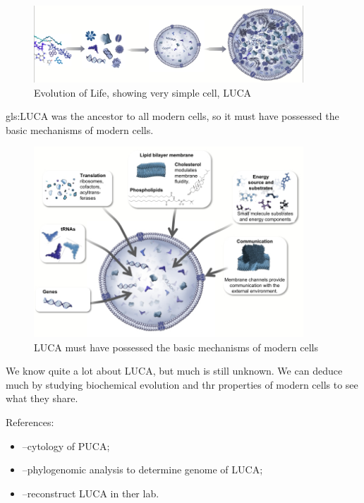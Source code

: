 \documentclass[]{article}
\begin{document}
\begin{figure}[H]
	\caption{Evolution of Life, showing very simple cell, LUCA}\label{fig:EvolCell}
	\includegraphics[width=0.9\textwidth]{EvolCell}
\end{figure}

\gls{gls:LUCA} was the ancestor to all modern cells, so it must have possessed the basic mechanisms of  modern cells.

\begin{figure}[H]
	\caption{LUCA must have possessed the basic mechanisms of  modern cells}\label{fig:LUCA_Attributes}
	\includegraphics[width=0.9\textwidth]{LUCA_Attributes}
\end{figure}

We know quite a lot about LUCA, but much is still unknown. We can deduce much by studying biochemical evolution and thr properties of modern cells to see what they share.

References:
\begin{itemize}
	\item \cite{penny1999nature}--cytology of PUCA;
	\item \cite{weiss2016physiology}--phylogenomic analysis to determine genome of LUCA;
	\item \cite{torino2013piecing}--reconstruct LUCA in ther lab.
\end{itemize}
\end{document}
